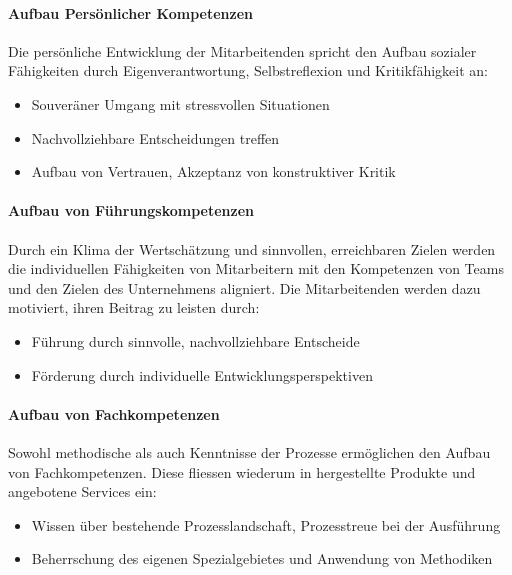 \paragraph*{Aufbau Persönlicher Kompetenzen}\mbox{}
\begin{sloppypar}
Die persönliche Entwicklung der Mitarbeitenden spricht den Aufbau sozialer Fähigkeiten durch Eigenverantwortung, Selbstreflexion und Kritikfähigkeit an:
\begin{itemize}
  \item Souveräner Umgang mit stressvollen Situationen
  \item Nachvollziehbare Entscheidungen treffen 
  \item Aufbau von Vertrauen, Akzeptanz von konstruktiver Kritik
\end{itemize}
\end{sloppypar}

\paragraph*{Aufbau von Führungskompetenzen}\mbox{}
\begin{sloppypar}
Durch ein Klima der Wertschätzung und sinnvollen, erreichbaren Zielen werden die individuellen Fähigkeiten von Mitarbeitern mit den Kompetenzen von Teams und den Zielen des Unternehmens aligniert. Die Mitarbeitenden werden dazu motiviert, ihren Beitrag zu leisten durch:
\begin{itemize}
  \item Führung durch sinnvolle, nachvollziehbare Entscheide
  \item Förderung durch individuelle Entwicklungsperspektiven 
\end{itemize}
\end{sloppypar}

\paragraph*{Aufbau von Fachkompetenzen}\mbox{}
\begin{sloppypar}
Sowohl methodische als auch Kenntnisse der Prozesse ermöglichen den Aufbau von Fachkompetenzen. Diese fliessen wiederum in hergestellte Produkte und angebotene Services ein:
\begin{itemize}
  \item Wissen über bestehende Prozesslandschaft, Prozesstreue bei der Ausführung
  \item Beherrschung des eigenen Spezialgebietes und Anwendung von Methodiken 
\end{itemize}
\end{sloppypar}
